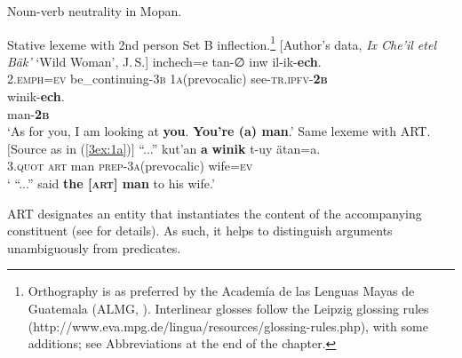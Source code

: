 \documentclass[output=paper]{langsci/langscibook}
\begin{document}
\begin{exe}
\ex\label{3ex:1}
Noun-verb neutrality in Mopan.
	\begin{xlista}
	\ex\label{3ex:1a}
	Stative lexeme with 2nd person Set B inflection.\footnote{Orthography is as preferred by the Academ\'ia de las Lenguas Mayas de Guatemala (ALMG, \citealt{england:elliott:90}). Interlinear glosses follow the Leipzig glossing rules (http://www.eva.mpg.de/lingua/resources/glossing-rules.php), with some additions; see Abbreviations at the end of the chapter.}\newline 
	[Author's data, {\emph{Ix Che'il etel B\"ak'}} `Wild Woman', J.\,S.]
	\exi{}
	\gll	inchech=e 		tan-{∅}				inw				il-ik-{\textbf{ech}}. \\
		2.{\textsc{emph=ev}}	be\_continuing-{\textsc{3b}}	1{\textsc{a}}(prevocalic)	see-{\textsc{tr.ipfv-{\textbf{2b}}}} \\
	\glt
	\exi{}
	\gll	winik-{\textbf{ech}}. \\
		man-{\textbf{{\textsc{2b}}}} \\
	\glt `As for you, I am looking at {\textbf{you}}. {\textbf{You're (a) man}}.'
	\ex\label{3ex:1b}
	Same lexeme with ART. \\
	$\lbrack$Source as in (\ref{3ex:1a})$\rbrack$
	\exi{}
	\gll ``...''	kut'an		{\textbf{a}}	{\textbf{winik}}		t-uy						\"atan=a. \\
		{}	3.{\textsc{quot}}	{\textsc{art}}		man			{\textsc{prep}}-3{\textsc{a}}(prevocalic)	wife={\textsc{ev}} \\
	\glt ` ``...'' said {\textbf{the [{\textsc{art}}] man}} to his wife.'
	\end{xlista}
\end{exe}

ART designates an entity that instantiates the content of the accompanying constituent (see \citealt{contini:morava:danziger:fc} for details). As such, it helps to distinguish arguments unambiguously from predicates.
\end{document}

